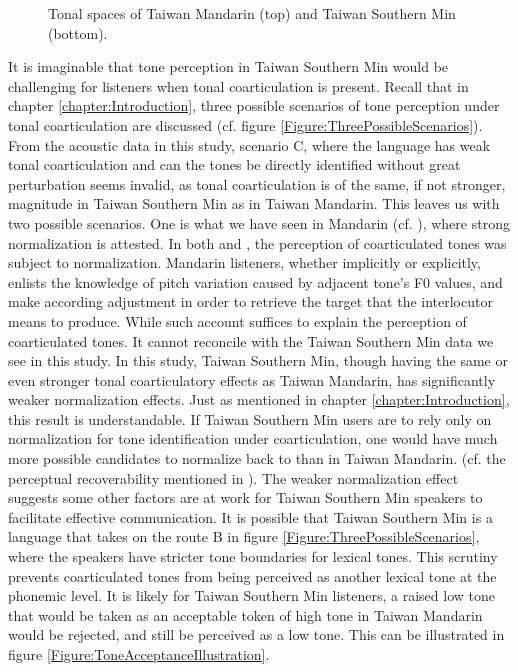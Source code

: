 \documentclass[12pt]{report}
\begin{document}
\begin{CJK}{UTF8}{bsmi}
\begin{figure}[hbt!]
\caption{Tonal spaces of Taiwan Mandarin (top) and Taiwan Southern Min (bottom).}
\label{Figure:ToneSpace}
\end{figure}
It is imaginable that tone perception in Taiwan Southern Min would be challenging for listeners when tonal coarticulation is present. Recall that in chapter \ref{chapter:Introduction}, three possible scenarios of tone perception under tonal coarticulation are discussed (cf. figure \ref{Figure:ThreePossibleScenarios}). From the acoustic data in this study, scenario C, where the language has weak tonal coarticulation and can the tones be directly identified without great perturbation seems invalid, as tonal coarticulation is of the same, if not stronger, magnitude in Taiwan Southern Min as in Taiwan Mandarin. This leaves us with two possible scenarios. One is what we have seen in Mandarin (cf. \citealp{Zhangetal2022}), where strong normalization is attested. In both \cite{Xu1994} and \citeauthor{Zhangetal2022}, the perception of coarticulated tones was subject to normalization. Mandarin listeners, whether implicitly or explicitly, enlists the knowledge of pitch variation caused by adjacent tone's F0 values, and make according adjustment in order to retrieve the target that the interlocutor means to produce. While such account suffices to explain the perception of coarticulated tones. It cannot reconcile with the Taiwan Southern Min data we see in this study. In this study, Taiwan Southern Min, though having the same or even stronger tonal coarticulatory effects as Taiwan Mandarin, has significantly weaker normalization effects. Just as mentioned in chapter \ref{chapter:Introduction}, this result is understandable. If Taiwan Southern Min users are to rely only on normalization for tone identification under coarticulation, one would have much more possible candidates to normalize back to than in Taiwan Mandarin. (cf. the perceptual recoverability mentioned in \citealp{Flemming2011}). The weaker normalization effect suggests some other factors are at work for Taiwan Southern Min speakers to facilitate effective communication. It is possible that Taiwan Southern Min is a language that takes on the route B in figure \ref{Figure:ThreePossibleScenarios}, where the speakers have stricter tone boundaries for lexical tones. This scrutiny prevents coarticulated tones from being perceived as another lexical tone at the phonemic level. It is likely for Taiwan Southern Min listeners, a raised low tone that would be taken as an acceptable token of high tone in Taiwan Mandarin would be rejected, and still be perceived as a low tone. This can be illustrated in figure \ref{Figure:ToneAcceptanceIllustration}. 

\end{CJK}
\end{document}
